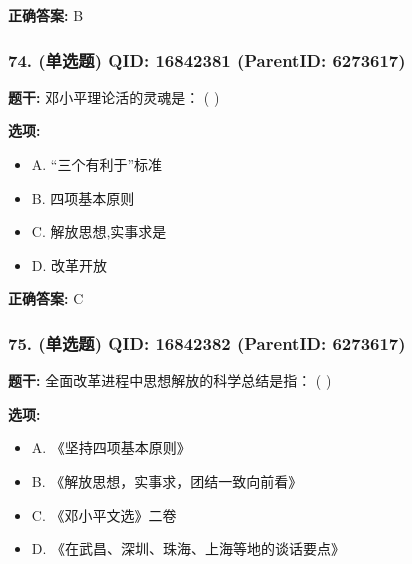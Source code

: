 \documentclass[12pt,UTF8]{ctexart}
\begin{document}
\textbf{正确答案:}
B

\vspace{0.3em}\hrulefill\vspace{0.7em}

\subsubsection*{74. (单选题) \small QID: 16842381 (ParentID: 6273617)}

\textbf{题干:}
邓小平理论活的灵魂是： ( )



\textbf{选项:}
\begin{itemize}[leftmargin=*]

  \item A. “三个有利于”标准

  \item B. 四项基本原则

  \item C. 解放思想,实事求是

  \item D. 改革开放

\end{itemize}

\textbf{正确答案:}
C

\vspace{0.3em}\hrulefill\vspace{0.7em}

\subsubsection*{75. (单选题) \small QID: 16842382 (ParentID: 6273617)}

\textbf{题干:}
全面改革进程中思想解放的科学总结是指： ( )



\textbf{选项:}
\begin{itemize}[leftmargin=*]

  \item A. 《坚持四项基本原则》

  \item B. 《解放思想，实事求，团结一致向前看》

  \item C. 《邓小平文选》二卷

  \item D. 《在武昌、深圳、珠海、上海等地的谈话要点》

\end{itemize}
\end{document}
